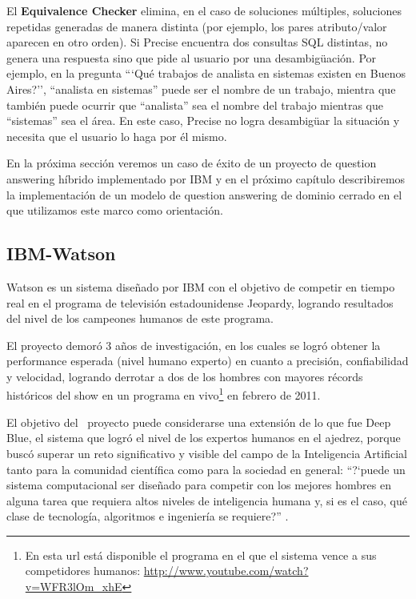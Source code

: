 El \textbf{Equivalence Checker} elimina, en el caso de soluciones múltiples, soluciones repetidas generadas de manera distinta (por ejemplo, los pares atributo/valor aparecen en otro orden). Si Precise encuentra dos consultas SQL distintas, no genera una respuesta sino que pide al usuario por una desambigüación. Por ejemplo, en la pregunta ```Qué trabajos de analista en sistemas existen en Buenos Aires?'', ``analista en sistemas'' puede ser el nombre de un trabajo, mientra que también puede ocurrir que ``analista'' sea el nombre del trabajo mientras que ``sistemas'' sea el área. En este caso, Precise no logra desambigüar la situación y necesita que el usuario lo haga por él mismo.

\medskip

En la próxima sección veremos un caso de éxito de un proyecto de question answering híbrido implementado por IBM y en el próximo capítulo describiremos la implementación de un modelo de question answering de dominio cerrado en el que utilizamos este marco como orientación.


\subsection{IBM-Watson}
\label{subsec:ibm-watson}
Watson\cite{WATSON1}\cite{WATSON2} es un sistema diseñado por IBM con el objetivo de competir en
tiempo real en el programa de televisión estadounidense Jeopardy,
logrando resultados del nivel de los campeones humanos de este
programa.

El proyecto demoró 3 años de investigación, en los cuales se
logró obtener la performance esperada (nivel humano experto) en
cuanto a precisión, confiabilidad y velocidad, logrando derrotar a
dos de los hombres con mayores récords históricos del show en un
programa en vivo\footnote{En esta url está disponible el programa en el que el sistema vence a sus competidores humanos: \url{http://www.youtube.com/watch?v=WFR3lOm_xhE}} en febrero de 2011.

El objetivo del \ proyecto puede considerarse una extensión de lo que
fue Deep Blue, el sistema que logró el nivel de los expertos humanos
en el ajedrez, porque buscó superar un reto  significativo y
visible del campo de la Inteligencia Artificial tanto para la comunidad
científica como para la sociedad en general:
{\textquotedblleft}?`puede un sistema computacional ser diseñado para
competir con los mejores hombres en alguna tarea que requiera altos
niveles de inteligencia humana y, si es el caso, qué clase de
tecnología, algoritmos e ingeniería se
requiere?{\textquotedblright} \cite{WATSON1}.

